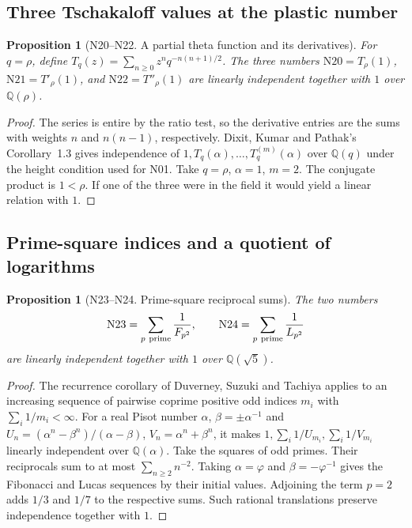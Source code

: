 \documentclass[11pt,a4paper]{article}
\newtheorem{proposition}[theorem]{Proposition}
\theoremstyle{definition}
\theoremstyle{remark}
\begin{document}
\subsection{Three Tschakaloff values at the plastic number}
\par\hypertarget{cat-N20}{}\label{page:N20}\hypertarget{cat-N21}{}\label{page:N21}\hypertarget{cat-N22}{}\label{page:N22}
\begin{proposition}[N20--N22. A partial theta function and its derivatives]
For $q=\rho$, define $T_q(z)=\sum_{n\ge0}z^n q^{-n(n+1)/2}$.
The three numbers $\mathrm{N20}=T_{\rho}(1)$,
$\mathrm{N21}=T'_{\rho}(1)$, and $\mathrm{N22}=T''_{\rho}(1)$
are linearly independent together with $1$ over $\mathbb Q(\rho)$.
\end{proposition}
\begin{proof}
The series is entire by the ratio test, so the derivative entries
are the sums with weights $n$ and $n(n-1)$, respectively.
Dixit, Kumar and Pathak's Corollary~1.3 \cite{nDKP} gives independence of
$1,T_q(\alpha),\ldots,T_q^{(m)}(\alpha)$ over $\mathbb Q(q)$ under
the height condition used for N01. Take $q=\rho$, $\alpha=1$, $m=2$.
The conjugate product is $1<\rho$. If one of the three were in the
field it would yield a linear relation with $1$.
\end{proof}

\subsection{Prime-square indices and a quotient of logarithms}
\par\hypertarget{cat-N23}{}\label{page:N23}\hypertarget{cat-N24}{}\label{page:N24}
\begin{proposition}[N23--N24. Prime-square reciprocal sums]
The two numbers
\[
 \mathrm{N23}=\sum_{p\ {\rm prime}}\frac1{F_{p^2}},\qquad
 \mathrm{N24}=\sum_{p\ {\rm prime}}\frac1{L_{p^2}}
\]
are linearly independent together with $1$ over $\mathbb Q(\sqrt5)$.
\end{proposition}
\begin{proof}
The recurrence corollary of Duverney, Suzuki and Tachiya
\cite[Cor.~1.2]{nDST} applies to an increasing sequence of pairwise
coprime positive odd indices $m_i$ with $\sum_i1/m_i<\infty$.
For a real Pisot number $\alpha$, $\beta=\pm\alpha^{-1}$ and
$U_n=(\alpha^n-\beta^n)/(\alpha-\beta)$, $V_n=\alpha^n+\beta^n$,
it makes $1,\sum_i1/U_{m_i},\sum_i1/V_{m_i}$ linearly independent
over $\mathbb Q(\alpha)$. Take the squares of odd primes. Their
reciprocals sum to at most $\sum_{n\ge2}n^{-2}$. Taking
$\alpha=\varphi$ and $\beta=-\varphi^{-1}$ gives the Fibonacci
and Lucas sequences by their initial values. Adjoining the term $p=2$
adds $1/3$ and $1/7$ to the respective sums. Such rational
translations preserve independence together with $1$.
\end{proof}
\end{document}
